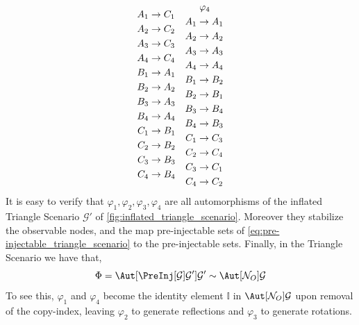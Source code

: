 \documentclass[aps, 10pt, english, twoside, pra, nofootinbib, longbibliography]{revtex4-1}
\theoremstyle{plain}
\theoremstyle{definition}
\theoremstyle{remark}
\newcommand{\graph}{\mathcal{G}}
\newcommand{\nodes}{\mathcal{N}}
\newcommand{\gelem}{\varphi}
\begin{document}
\begin{equation*}
\begin{aligned}[c]
    A_1 &\to C_1 \\A_2 &\to C_2 \\A_3 &\to C_3 \\A_4 &\to C_4 \\B_1 &\to A_1 \\B_2 &\to A_2 \\B_3 &\to A_3 \\B_4 &\to A_4 \\C_1 &\to B_1 \\C_2 &\to B_2 \\C_3 &\to B_3 \\C_4 &\to B_4
    \end{aligned}
    \quad
    \begin{aligned}[c]
    &\hspace{1mm}\gelem_4 \\
    A_1 &\to A_1 \\A_2 &\to A_2 \\A_3 &\to A_3 \\A_4 &\to A_4 \\B_1 &\to B_2 \\B_2 &\to B_1 \\B_3 &\to B_4 \\B_4 &\to B_3 \\C_1 &\to C_3 \\C_2 &\to C_4 \\C_3 &\to C_1 \\C_4 &\to C_2
    \end{aligned}
    \end{equation*}
    It is easy to verify that $\gelem_1, \gelem_2, \gelem_3, \gelem_4$ are all automorphisms of the inflated Triangle Scenario $\graph'$ of \cref{fig:inflated_triangle_scenario}. Moreover they stabilize the observable nodes, and the map pre-injectable sets of \cref{eq:pre-injectable_triangle_scenario} to the pre-injectable sets. Finally, in the Triangle Scenario we have that,
    \[ \Phi = \Aut[\PreInj[\graph]{\graph'}]{\graph'} \sim \Aut[\nodes_O]{\graph} \]
    To see this, $\gelem_1$ and $\gelem_4$ become the identity element $\mathbb{I}$ in $\Aut[\nodes_O]{\graph}$ upon removal of the copy-index, leaving $\gelem_2$ to generate reflections and $\gelem_3$ to generate rotations.
\end{document}
